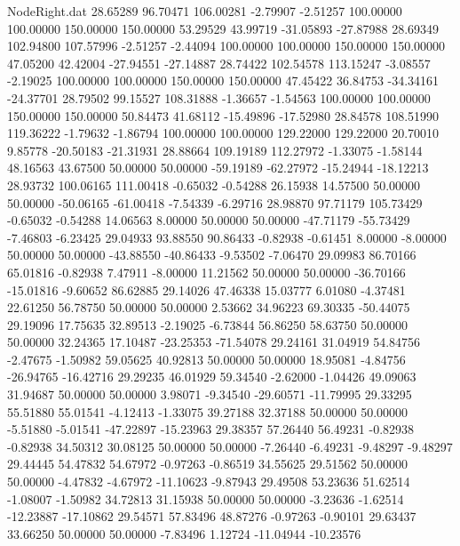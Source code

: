 \begin{filecontents}{NodeRight.dat}
  28.65289   96.70471  106.00281    -2.79907   -2.51257  100.00000  100.00000  150.00000  150.00000   53.29529   43.99719  -31.05893  -27.87988
  28.69349  102.94800  107.57996    -2.51257   -2.44094  100.00000  100.00000  150.00000  150.00000   47.05200   42.42004  -27.94551  -27.14887
  28.74422  102.54578  113.15247    -3.08557   -2.19025  100.00000  100.00000  150.00000  150.00000   47.45422   36.84753  -34.34161  -24.37701
  28.79502   99.15527  108.31888    -1.36657   -1.54563  100.00000  100.00000  150.00000  150.00000   50.84473   41.68112  -15.49896  -17.52980
  28.84578  108.51990  119.36222    -1.79632   -1.86794  100.00000  100.00000  129.22000  129.22000   20.70010    9.85778  -20.50183  -21.31931
  28.88664  109.19189  112.27972    -1.33075   -1.58144   48.16563   43.67500   50.00000   50.00000  -59.19189  -62.27972  -15.24944  -18.12213
  28.93732  100.06165  111.00418    -0.65032   -0.54288   26.15938   14.57500   50.00000   50.00000  -50.06165  -61.00418   -7.54339   -6.29716
  28.98870   97.71179  105.73429    -0.65032   -0.54288   14.06563    8.00000   50.00000   50.00000  -47.71179  -55.73429   -7.46803   -6.23425
  29.04933   93.88550   90.86433    -0.82938   -0.61451    8.00000   -8.00000   50.00000   50.00000  -43.88550  -40.86433   -9.53502   -7.06470
  29.09983   86.70166   65.01816    -0.82938    7.47911   -8.00000   11.21562   50.00000   50.00000  -36.70166  -15.01816   -9.60652   86.62885
  29.14026   47.46338   15.03777     6.01080   -4.37481   22.61250   56.78750   50.00000   50.00000    2.53662   34.96223   69.30335  -50.44075
  29.19096   17.75635   32.89513    -2.19025   -6.73844   56.86250   58.63750   50.00000   50.00000   32.24365   17.10487  -23.25353  -71.54078
  29.24161   31.04919   54.84756    -2.47675   -1.50982   59.05625   40.92813   50.00000   50.00000   18.95081   -4.84756  -26.94765  -16.42716
  29.29235   46.01929   59.34540    -2.62000   -1.04426   49.09063   31.94687   50.00000   50.00000    3.98071   -9.34540  -29.60571  -11.79995
  29.33295   55.51880   55.01541    -4.12413   -1.33075   39.27188   32.37188   50.00000   50.00000   -5.51880   -5.01541  -47.22897  -15.23963
  29.38357   57.26440   56.49231    -0.82938   -0.82938   34.50312   30.08125   50.00000   50.00000   -7.26440   -6.49231   -9.48297   -9.48297
  29.44445   54.47832   54.67972    -0.97263   -0.86519   34.55625   29.51562   50.00000   50.00000   -4.47832   -4.67972  -11.10623   -9.87943
  29.49508   53.23636   51.62514    -1.08007   -1.50982   34.72813   31.15938   50.00000   50.00000   -3.23636   -1.62514  -12.23887  -17.10862
  29.54571   57.83496   48.87276    -0.97263   -0.90101   29.63437   33.66250   50.00000   50.00000   -7.83496    1.12724  -11.04944  -10.23576

\end{filecontents}
